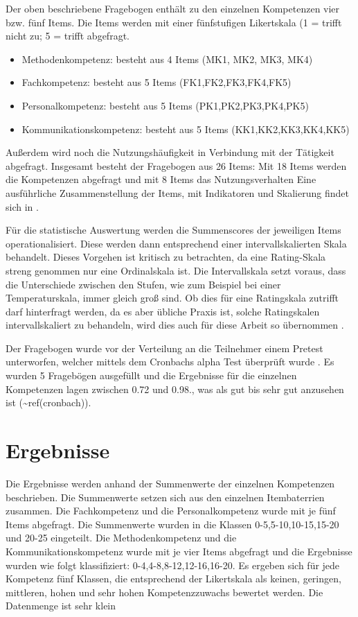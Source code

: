\documentclass[12pt, bibliography=totoc]{scrartcl}
\begin{document}
Der oben beschriebene Fragebogen enthält zu den einzelnen Kompetenzen
vier bzw. fünf Items. Die Items werden mit einer fünfstufigen
Likertskala (1 = trifft nicht zu; 5 = trifft abgefragt.

\begin{itemize}
\tightlist
\item
  Methodenkompetenz: besteht aus 4 Items (MK1, MK2, MK3, MK4)
\item
  Fachkompetenz: besteht aus 5 Items (FK1,FK2,FK3,FK4,FK5)
\item
  Personalkompetenz: besteht aus 5 Items (PK1,PK2,PK3,PK4,PK5)
\item
  Kommunikationskompetenz: besteht aus 5 Items (KK1,KK2,KK3,KK4,KK5)
\end{itemize}

Außerdem wird noch die Nutzungshäufigkeit in Verbindung mit der
Tätigkeit abgefragt. Insgesamt besteht der Fragebogen aus 26 Items: Mit
18 Items werden die Kompetenzen abgefragt und mit 8 Items das
Nutzungsverhalten Eine ausführliche Zusammenstellung der Items, mit
Indikatoren und Skalierung findet sich in
.

Für die statistische Auswertung werden die Summenscores der jeweiligen
Items operationalisiert. Diese werden dann entsprechend einer
intervallskalierten Skala behandelt. Dieses Vorgehen ist kritisch zu
betrachten, da eine Rating-Skala streng genommen nur eine Ordinalskala
ist. Die Intervallskala setzt voraus, dass die Unterschiede zwischen den
Stufen, wie zum Beispiel bei einer Temperaturskala, immer gleich groß
sind. Ob dies für eine Ratingskala zutrifft darf hinterfragt werden, da
es aber übliche Praxis ist, solche Ratingskalen intervallskaliert zu
behandeln, wird dies auch für diese Arbeit so übernommen
\parencite[65]{Sedlmeier2013}.

Der Fragebogen wurde vor der Verteilung an die Teilnehmer einem Pretest
unterworfen, welcher mittels dem Cronbachs alpha Test überprüft wurde
\parencite{Wassa}. Es wurden 5 Fragebögen ausgefüllt und die Ergebnisse
für die einzelnen Kompetenzen lagen zwischen 0.72 und 0.98., was als gut
bis sehr gut anzusehen ist (\textasciitilde{}ref(cronbach)).

\section{Ergebnisse}\label{ergebnisse}

Die Ergebnisse werden anhand der Summenwerte der einzelnen Kompetenzen
beschrieben. Die Summenwerte setzen sich aus den einzelnen Itembaterrien
zusammen. Die Fachkompetenz und die Personalkompetenz wurde mit je fünf
Items abgefragt. Die Summenwerte wurden in die Klassen
0-5,5-10,10-15,15-20 und 20-25 eingeteilt. Die Methodenkompetenz und die
Kommunikationskompetenz wurde mit je vier Items abgefragt und die
Ergebnisse wurden wie folgt klassifiziert: 0-4,4-8,8-12,12-16,16-20. Es
ergeben sich für jede Kompetenz fünf Klassen, die entsprechend der
Likertskala als keinen, geringen, mittleren, hohen und sehr hohen
Kompetenzzuwachs bewertet werden. Die Datenmenge ist sehr klein
\end{document}
